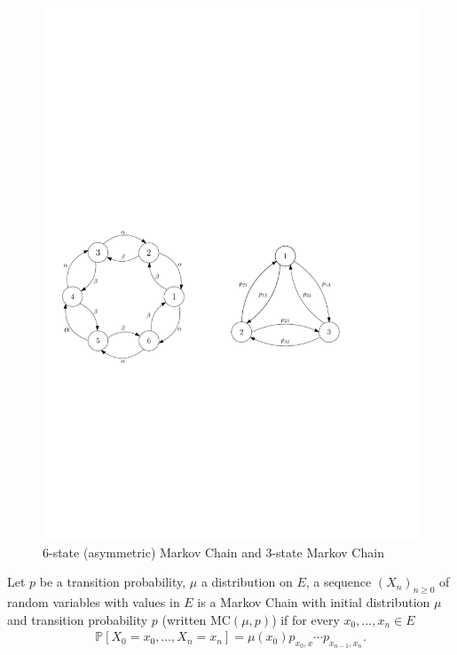 \begin{figure}[!h]
	\centering
	\includegraphics[width=\textwidth]{figures/n_step_MC.pdf}
\caption{6-state (asymmetric) Markov Chain and 3-state Markov Chain}
\end{figure}

\begin{defn}
	Let $p$ be a transition probability, $\mu$ a distribution on $E$, a sequence $(X_n)_{n\geq 0}$ of random variables with values in $E $ is a Markov Chain with initial distribution $\mu$ and transition probability $p$ (written $ \textrm{MC}(\mu, p)$) if for every $x_0, \ldots, x_n \in E$
\begin{align}
	\boxed{ \mathbb{P} \left[ X_0=x_0, \ldots ,X_n=x_n \right] = \mu(x_0)p_{x_0,x} \cdots p_{x_{n-1},x_{n}} .}
\end{align}
\end{defn}


